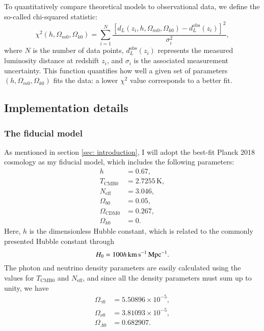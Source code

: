 \documentclass{aa}
\begin{document}
To quantitatively compare theoretical models to observational data, we define the so-called chi-squared statistic:
\begin{equation}
  \chi^2(h, \Omega_{m0}, \Omega_{k0}) = \sum_{i=1}^{N} \frac{ \left[ d_L(z_i, h, \Omega_{m0}, \Omega_{k0}) - d_L^{\text{obs}}(z_i) \right]^2 }{\sigma_i^2},
\end{equation}
where $N$ is the number of data points, $d_L^{\text{obs}}(z_i)$ represents the measured luminosity distance at redshift $z_i$, and $\sigma_i$ is the associated measurement uncertainty. This function quantifies how well a given set of parameters $(h, \Omega_{m0}, \Omega_{k0})$ fits the data: a lower $\chi^2$ value corresponds to a better fit. 


\subsection{Implementation details}\label{subsec: I methods}
\subsubsection{The fiducial model}
As mentioned in section \ref{sec: introduction}, I will adopt the best-fit Planck 2018 cosmology \citep[see][]{Planck} as my fiducial model, which includes the following parameters:
\begin{align*}
    h &= 0.67,
    \\
    T_{\text{CMB}0} &= 2.7255\,\text{K},
    \\
    N_\text{eff} &= 3.046,
    \\
    \Omega_{b0} &= 0.05,
    \\
    \Omega_{\text{CDM}0} &= 0.267,
    \\
    \Omega_{k0} &= 0.
\end{align*}
Here, $h$ is the dimensionless Hubble constant, which is related to the commonly presented Hubble constant through
\begin{equation*}
    H_0 = 100h\,\text{km\,s}^{-1}\text{\,Mpc}^{-1}.
\end{equation*}
The photon and neutrino density parameters are easily calculated using the values for $T_{\text{CMB}0}$ and $N_\text{eff}$, and since all the density parameters must sum up to unity, we have
\begin{align*}
  \Omega_{\gamma0} &= 5.50896\times10^{-5},
  \\
  \Omega_{\nu0} &=  3.81093\times10^{-5},
  \\
  \Omega_{\Lambda0} &= 0.682907.
\end{align*}
\end{document}
